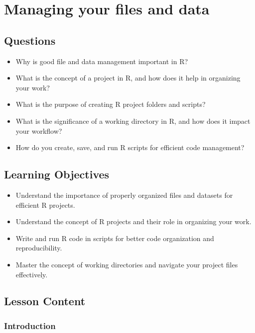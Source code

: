 \documentclass[
  letterpaper,
  DIV=11,
  numbers=noendperiod]{scrreprt}
\begin{document}

\chapter{Managing your files and data}\label{sec-managing}

\section{Questions}\label{questions-3}

\begin{itemize}
\item
  Why is good file and data management important in R?
\item
  What is the concept of a project in R, and how does it help in
  organizing your work?
\item
  What is the purpose of creating R project folders and scripts?
\item
  What is the significance of a working directory in R, and how does it
  impact your workflow?
\item
  How do you create, save, and run R scripts for efficient code
  management?
\end{itemize}

\section{Learning Objectives}\label{learning-objectives-3}

\begin{itemize}
\item
  Understand the importance of properly organized files and datasets for
  efficient R projects.
\item
  Understand the concept of R projects and their role in organizing your
  work.
\item
  Write and run R code in scripts for better code organization and
  reproducibility.
\item
  Master the concept of working directories and navigate your project
  files effectively.
\end{itemize}

\section{Lesson Content}\label{lesson-content-3}

\subsection{Introduction}\label{introduction-2}
\end{document}

